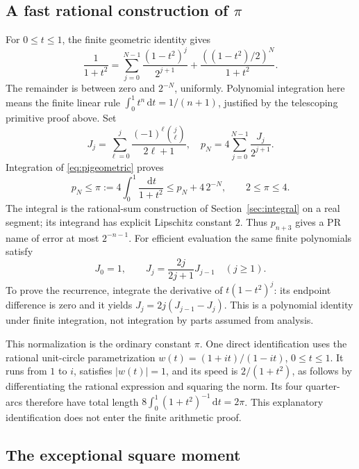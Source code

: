 \documentclass[11pt]{article}
\theoremstyle{definition}
\newcommand{\dd}{\,\mathrm d}
\begin{document}
\subsection{A fast rational construction of \texorpdfstring{\(\pi\)}{pi}}

For \(0\le t\le1\), the finite geometric identity gives
\begin{equation}\label{eq:pigeometric}
 \frac1{1+t^2}
 =\sum_{j=0}^{N-1}\frac{(1-t^2)^j}{2^{j+1}}
   +\frac{((1-t^2)/2)^N}{1+t^2}.
\end{equation}
The remainder is between zero and \(2^{-N}\), uniformly.
Polynomial integration here means the finite linear rule
\(\int_0^1t^n\dd t=1/(n+1)\), justified by the telescoping primitive
proof above. Set
\begin{equation}\label{eq:piapprox}
 J_j=\sum_{\ell=0}^{j}
       \frac{(-1)^\ell\binom j\ell}{2\ell+1},\quad
 p_N=4\sum_{j=0}^{N-1}\frac{J_j}{2^{j+1}}.
\end{equation}
Integration of \eqref{eq:pigeometric} proves
\begin{equation}\label{eq:pibound}
 p_N\le\pi:=4\int_0^1\frac{\dd t}{1+t^2}
          \le p_N+4\,2^{-N},\qquad 2\le\pi\le4.
\end{equation}
The integral is the rational-sum construction of Section~\ref{sec:integral}
on a real segment; its integrand has explicit Lipschitz constant \(2\).
Thus \(p_{n+3}\) gives a PR name of error at most \(2^{-n-1}\).
For efficient evaluation the same finite polynomials satisfy
\begin{equation}\label{eq:Jrec}
 J_0=1,\qquad J_j=\frac{2j}{2j+1}J_{j-1}\quad(j\ge1).
\end{equation}
To prove the recurrence, integrate the derivative of
\(t(1-t^2)^j\): its endpoint difference is zero and it yields
\(J_j=2j(J_{j-1}-J_j)\). This is a polynomial identity under finite
integration, not integration by parts assumed from analysis.

This normalization is the ordinary constant \(\pi\). One direct
identification uses the rational unit-circle parametrization
\(w(t)=(1+it)/(1-it)\), \(0\le t\le1\). It runs from \(1\) to \(i\),
satisfies \(|w(t)|=1\), and its speed is \(2/(1+t^2)\), as follows by
differentiating the rational expression and squaring the norm.
Its four quarter-arcs therefore have total length
\(8\int_0^1(1+t^2)^{-1}\dd t=2\pi\). This explanatory identification
does not enter the finite arithmetic proof.

\subsection{The exceptional square moment}
\end{document}
